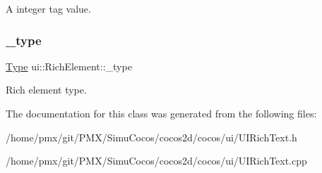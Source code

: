 A integer tag value. \mbox{\label{classui_1_1RichElement_afdd04e534f90d73d1a818679d685f7df}} 
\subsubsection{\texorpdfstring{\+\_\+type}{\_type}}
{\footnotesize\ttfamily \hyperlink{classui_1_1RichElement_a6840f6ae352b476f553659d9ecbf48c3}{Type} ui\+::\+Rich\+Element\+::\+\_\+type\hspace{0.3cm}{\ttfamily [protected]}}

Rich element type. 

The documentation for this class was generated from the following files\+:\begin{DoxyCompactItemize}
\item 
/home/pmx/git/\+P\+M\+X/\+Simu\+Cocos/cocos2d/cocos/ui/U\+I\+Rich\+Text.\+h\item 
/home/pmx/git/\+P\+M\+X/\+Simu\+Cocos/cocos2d/cocos/ui/U\+I\+Rich\+Text.\+cpp\end{DoxyCompactItemize}
